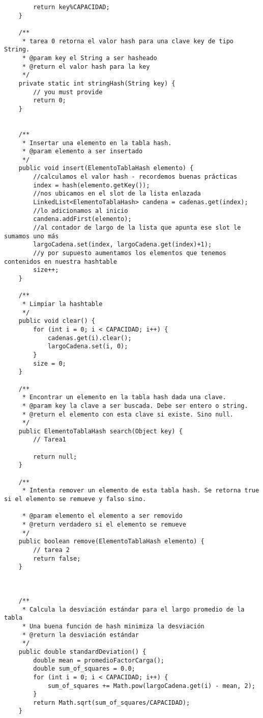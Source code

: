 \begin{lstlisting}
        return key%CAPACIDAD;
    }

    /**
     * tarea 0 retorna el valor hash para una clave key de tipo String. 
     * @param key el String a ser hasheado 
     * @return el valor hash para la key 
     */
    private static int stringHash(String key) {
        // you must provide
        return 0;
    }
    	
   
    /**
     * Insertar una elemento en la tabla hash. 
     * @param elemento a ser insertado
     */
    public void insert(ElementoTablaHash elemento) {
        //calculamos el valor hash - recordemos buenas prácticas
    	index = hash(elemento.getKey());
    	//nos ubicamos en el slot de la lista enlazada
        LinkedList<ElementoTablaHash> candena = cadenas.get(index);
        //lo adicionamos al inicio
        candena.addFirst(elemento);
        //al contador de largo de la lista que apunta ese slot le sumamos uno más
        largoCadena.set(index, largoCadena.get(index)+1);
        //y por supuesto aumentamos los elementos que tenemos contenidos en nuestra hashtable
        size++;
    }
    
    /**
     * Limpiar la hashtable
     */
    public void clear() {
        for (int i = 0; i < CAPACIDAD; i++) {
            cadenas.get(i).clear();
            largoCadena.set(i, 0);
        }
        size = 0;
    }

    /**
     * Encontrar un elemento en la tabla hash dada una clave. 
     * @param key la clave a ser buscada. Debe ser entero o string.
     * @return el elemento con esta clave si existe. Sino null.
     */
    public ElementoTablaHash search(Object key) {
        // Tarea1
    	
        return null;
    }

    /**
     * Intenta remover un elemento de esta tabla hash. Se retorna true si el elemento se remueve y falso sino. 

     * @param elemento el elemento a ser removido
     * @return verdadero si el elemento se remueve
     */
    public boolean remove(ElementoTablaHash elemento) {
        // tarea 2
        return false;
    }

 
   
    /**
     * Calcula la desviación estándar para el largo promedio de la tabla 
	 * Una buena función de hash minimiza la desviación
     * @return la desviación estándar 
     */
    public double standardDeviation() {
        double mean = promedioFactorCarga();
        double sum_of_squares = 0.0;
        for (int i = 0; i < CAPACIDAD; i++) {
            sum_of_squares += Math.pow(largoCadena.get(i) - mean, 2);
        }
        return Math.sqrt(sum_of_squares/CAPACIDAD);
    }


\end{lstlisting}
